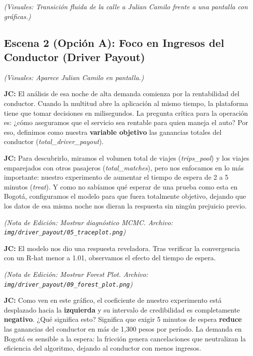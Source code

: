 \documentclass[11pt,a4paper]{article}
\begin{document}
\textit{(Visuales: Transición fluida de la calle a Julian Camilo frente a una pantalla con gráficas.)}

\newpage

\subsection{Escena 2 (Opción A): Foco en Ingresos del Conductor (Driver Payout)}
\textit{(Visuales: Aparece Julian Camilo en pantalla.)}

\textbf{JC:} El análisis de esa noche de alta demanda comienza por la rentabilidad del conductor. Cuando la multitud abre la aplicación al mismo tiempo, la plataforma tiene que tomar decisiones en milisegundos. La pregunta crítica para la operación es: ¿cómo aseguramos que el servicio sea rentable para quien maneja el auto? Por eso, definimos como nuestra \textbf{variable objetivo} las ganancias totales del conductor (\textit{total\_driver\_payout}).

\textbf{JC:} Para descubrirlo, miramos el volumen total de viajes (\textit{trips\_pool}) y los viajes emparejados con otros pasajeros (\textit{total\_matches}), pero nos enfocamos en lo más importante: nuestro experimento de aumentar el tiempo de espera de 2 a 5 minutos (\textit{treat}). Y como no sabíamos qué esperar de una prueba como esta en Bogotá, configuramos el modelo para que fuera totalmente objetivo, dejando que los datos de esa misma noche nos dieran la respuesta sin ningún prejuicio previo.

\textit{(Nota de Edición: Mostrar diagnóstico MCMC. Archivo: \texttt{img/driver\_payout/05\_traceplot.png})}

\textbf{JC:} El modelo nos dio una respuesta reveladora. Tras verificar la convergencia con un R-hat menor a 1.01, observamos el efecto del tiempo de espera.

\textit{(Nota de Edición: Mostrar Forest Plot. Archivo: \texttt{img/driver\_payout/09\_forest\_plot.png})}

\textbf{JC:} Como ven en este gráfico, el coeficiente de nuestro experimento está desplazado hacia la \textbf{izquierda} y su intervalo de credibilidad es completamente \textbf{negativo}. ¿Qué significa esto? Significa que exigir 5 minutos de espera \textbf{reduce} las ganancias del conductor en más de 1,300 pesos por período. La demanda en Bogotá es sensible a la espera: la fricción genera cancelaciones que neutralizan la eficiencia del algoritmo, dejando al conductor con menos ingresos.
\end{document}
